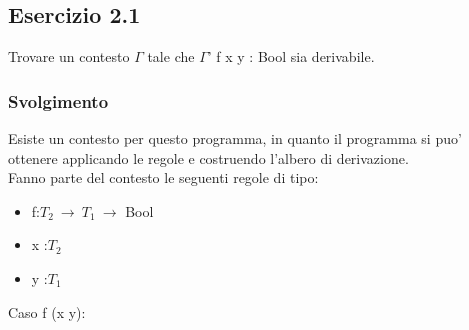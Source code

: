     \vspace*{1 cm}

\subsection*{Esercizio 2.1}
Trovare un contesto $\Gamma$ tale che $\Gamma$' f x y : Bool sia derivabile.

\subsubsection*{Svolgimento}
 	\begin{prooftree} 
	\end{prooftree} 
	
	Esiste un contesto per questo programma, in quanto il programma si puo' ottenere applicando le regole e costruendo l'albero di derivazione. \\
	Fanno parte del contesto le seguenti regole di tipo:
\begin{itemize}
	\item f:$T_2\:\rightarrow\:T_1\:\rightarrow$ Bool
	\item x :$T_2$
	\item y :$T_1$
\end{itemize}

\vspace*{2 cm}
Caso f (x y):\\
 	\begin{prooftree} 
	\end{prooftree} 
	
